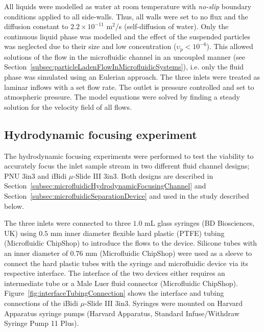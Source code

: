 All liquids were modelled as water at room temperature with \textit{no-slip} boundary conditions applied to all side-walls. Thus, all walls were set to no flux and the diffusion constant to $2.2\times10^{-11}$ m$^{2}$/s (self-diffusion of water). Only the continuous liquid phase was modelled and the effect of the suspended particles was neglected due to their size and low concentration ($\upsilon_{p} < 10^{-6}$). This allowed solutions of the flow in the microfluidic channel in an uncoupled manner (see Section~\ref{subsec:particleLadenFlowInMicrofluidicSystems}), i.e. only the fluid phase was simulated using an Eulerian approach. The three inlets were treated as laminar inflows with a set flow rate. The outlet is pressure controlled and set to atmospheric pressure. The model equations were solved by finding a steady solution for the velocity field of all flows.

\subsection{Hydrodynamic focusing experiment}\label{subsec:hydrodynamicFocusingExperiment}
The hydrodynamic focusing experiments were performed to test the viability to accurately focus the inlet sample stream in two different fluid channel designs; PNU 3in3 and iBidi $\mu$-Slide III 3in3. Both designs are described in Section~\ref{subsec:microfluidicHydrodynamicFocusingChannel} and Section~\ref{subsec:microfluidicSeparationDevice} and used in the study described below. 

The three inlets were connected to three $1.0$ mL glass syringes (BD Biosciences, UK) using $0.5$ mm inner diameter flexible hard plastic (PTFE) tubing (Microfluidic ChipShop) to introduce the flows to the device. Silicone tubes with an inner diameter of $0.76$ mm (Microfluidic ChipShop) were used as a sleeve to connect the hard plastic tubes with the syringe and microfluidic device via its respective interface. The interface of the two devices either requires an intermediate tube or a Male Luer fluid connector (Microfluidic ChipShop). Figure~\ref{fig:interfaceTubingConnection} shows the interface and tubing connections of the iBidi $\mu$-Slide III 3in3. Syringes were mounted on Harvard Apparatus syringe pumps (Harvard Apparatus, Standard Infuse/Withdraw Syringe Pump 11 Plus). 

